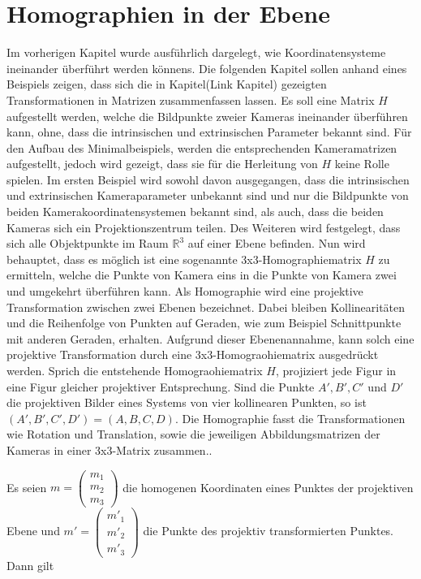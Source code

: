 \chapter{Homographien in der Ebene}


Im vorherigen Kapitel wurde ausführlich dargelegt, wie Koordinatensysteme ineinander überführt werden könnens. Die folgenden Kapitel sollen anhand eines Beispiels zeigen, dass sich die in Kapitel(Link Kapitel) gezeigten Transformationen in Matrizen zusammenfassen lassen. Es soll eine Matrix $H$ aufgestellt werden, welche die Bildpunkte zweier Kameras ineinander überführen kann, ohne, dass die intrinsischen und extrinsischen Parameter bekannt sind. Für den Aufbau des Minimalbeispiels, werden die entsprechenden Kameramatrizen aufgestellt, jedoch wird gezeigt, dass sie für die Herleitung von $H$ keine Rolle spielen. Im ersten Beispiel wird sowohl davon ausgegangen, dass die intrinsischen und extrinsischen Kameraparameter unbekannt sind und nur die Bildpunkte von beiden Kamerakoordinatensystemen bekannt sind, als auch, dass die beiden Kameras sich ein Projektionszentrum teilen.  Des Weiteren wird festgelegt, dass sich alle Objektpunkte im Raum $\mathbb{R}^3$ auf einer Ebene befinden. Nun wird behauptet, dass es möglich ist eine sogenannte 3x3-Homographiematrix $H$ zu ermitteln, welche die Punkte von Kamera eins in die Punkte von Kamera zwei und umgekehrt überführen kann. Als Homographie wird eine projektive Transformation zwischen zwei Ebenen bezeichnet. Dabei bleiben Kollinearitäten und die Reihenfolge von Punkten auf Geraden, wie zum Beispiel Schnittpunkte mit anderen Geraden, erhalten. Aufgrund dieser Ebenenannahme, kann solch eine projektive Transformation durch eine 3x3-Homograohiematrix ausgedrückt werden\cite{Roser}. Sprich die entstehende Homograohiematrix $H$, projiziert jede Figur in eine Figur gleicher projektiver Entsprechung\cite{HZ,Elements}. Sind die Punkte $A',B',C'$ und $D'$ die projektiven Bilder eines Systems von vier kollinearen Punkten, so ist $(A',B',C',D') = (A,B,C,D)$\cite{Peiffer}. Die Homographie fasst die Transformationen wie Rotation und Translation, sowie die jeweiligen Abbildungsmatrizen der Kameras in einer 3x3-Matrix zusammen.\cite{Elements,Peiffer}.
 
Es seien \ensuremath{m = \begin{pmatrix}
		m_1\\m_2\\m_3
\end{pmatrix}} die homogenen Koordinaten eines Punktes der projektiven Ebene und \ensuremath{m' = \begin{pmatrix}
m'_1\\m'_2\\m'_3
\end{pmatrix}} die Punkte des projektiv transformierten Punktes. Dann gilt

